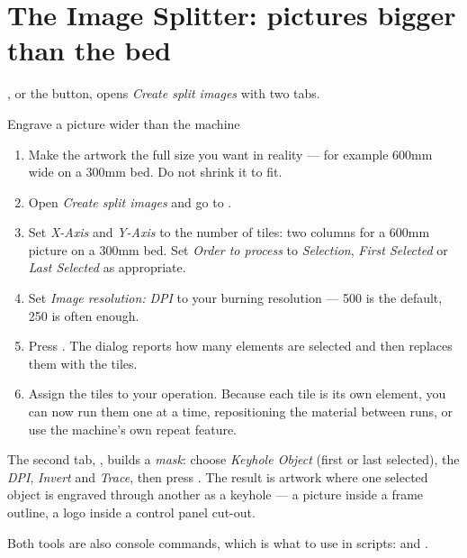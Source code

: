 \section{The Image Splitter: pictures bigger than the bed}

, or the  button, opens
\emph{Create split images} with two tabs.

\begin{walkthrough}{Engrave a picture wider than the machine}
\begin{enumerate}[label=\arabic*.,leftmargin=1.4em]
  \item Make the artwork the full size you want in reality --- for example
        600\unit{mm} wide on a 300\unit{mm} bed. Do not shrink it to fit.
  \item Open \emph{Create split images} and go to .
  \item Set \emph{X-Axis} and \emph{Y-Axis} to the number of tiles: two columns
        for a 600\unit{mm} picture on a 300\unit{mm} bed. Set \emph{Order to
        process} to \emph{Selection}, \emph{First Selected} or
        \emph{Last Selected} as appropriate.
  \item Set \emph{Image resolution:} \emph{DPI} to your burning resolution ---
        500 is the default, 250 is often enough.
  \item Press . The dialog reports how many elements are
        selected and then replaces them with the tiles.
  \item Assign the tiles to your  operation. Because each tile is
        its own element, you can now run them one at a time, repositioning the
        material between runs, or use the machine's own repeat feature.
\end{enumerate}
\end{walkthrough}

\noindent The second tab, , builds a \emph{mask}:
choose \emph{Keyhole Object} (first or last selected), the \emph{DPI},
\emph{Invert} and \emph{Trace}, then press . The result
is artwork where one selected object is engraved through another as a keyhole
--- a picture inside a frame outline, a logo inside a control panel cut-out.

\noindent Both tools are also console commands, which is what to use in scripts:
 and .

